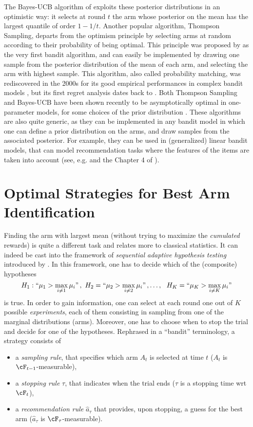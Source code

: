 \documentclass[proc]{edpsmath}
\begin{document}
	The Bayes-UCB algorithm of \cite{AISTATS12} exploits these posterior distributions in an optimistic way: it selects at round $t$ the arm whose posterior on the mean has the largest quantile of order $1-1/t$. Another popular algorithm, Thompson Sampling, departs from the optimism principle by selecting arms at random according to their probability of being optimal. This principle was proposed by \cite{Thompson33} as the very first bandit algorithm, and can easily be implemented by drawing one sample from the posterior distribution of the mean of each arm, and selecting the arm with highest sample. This algorithm, also called probability matching, was rediscovered in the 2000s for its good empirical performances in complex bandit models \cite{Scott10,LiChapelle11}, but its first regret analysis dates back to \cite{AGCOLT12}. Both Thompson Sampling and Bayes-UCB have been shown recently to be asymptotically optimal in one-parameter models, for some choices of the prior distribution \cite{ALT12,AGAISTAT13,AOS16}. These algorithms are also quite generic, as they can be implemented in any bandit model in which one can define a prior distribution on the arms, and draw samples from the associated posterior. For example, they can be used in (generalized) linear bandit models, that can model recommendation tasks where the features of the items are taken into account (see, e.g. \cite{AGAISTAT13} and the Chapter 4 of \cite{MaThese}). 
	
	
	\section{Optimal Strategies for Best Arm Identification}\label{sec:BestArmIdentification}
	Finding the arm with largest mean (without trying to maximize the \emph{cumulated} rewards) is quite a different task and relates more to classical statistics. It can indeed be cast into the framework of \emph{sequential adaptive hypothesis testing} introduced by \cite{Chernoff59}. In this framework, one has to decide which of the (composite) hypotheses 
	\[H_1 : ``\mu_1 > \max_{i\neq 1} \mu_i"\,, \ H_2 = ``\mu_2 > \max_{i\neq 2} \mu_i" \,, \dots, \ \ H_K = ``\mu_K > \max_{i\neq K} \mu_i"\]
	is true. In order to gain information, one can select at each round one out of $K$ possible \emph{experiments}, each of them consisting in sampling from one of the marginal distributions (arms). Moreover, one has to choose when to stop the trial and decide for one of the hypotheses. Rephrased in a ``bandit'' terminology, a strategy consists of
	\begin{itemize}
		\item a \emph{sampling rule}, that specifies which arm $A_t$ is selected at time $t$ ($A_t$ is $\cF_{t-1}$-measurable), 
		\item a \emph{stopping rule} $\tau$, that indicates when the trial ends ($\tau$ is a stopping time wrt $\cF_t$),
		\item a \emph{recommendation rule} $\hat{a}_{\tau}$ that provides, upon stopping, a guess for the best arm ($\hat{a}_{\tau}$ is $\cF_\tau$-measurable).
	\end{itemize}
	
\end{document}
